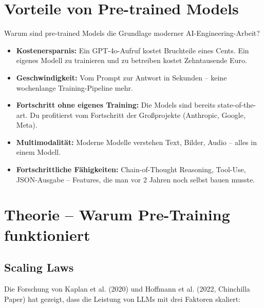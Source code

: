 \section{Vorteile von Pre-trained Models}

Warum sind pre-trained Models die Grundlage moderner AI-Engineering-Arbeit?

\begin{itemize}[leftmargin=*]
    \item \textbf{Kostenersparnis:} Ein GPT-4o-Aufruf kostet Bruchteile eines Cents. Ein eigenes Modell zu trainieren und zu betreiben kostet Zehntausende Euro.
    \item \textbf{Geschwindigkeit:} Vom Prompt zur Antwort in Sekunden -- keine wochenlange Training-Pipeline mehr.
    \item \textbf{Fortschritt ohne eigenes Training:} Die Models sind bereits state-of-the-art. Du profitierst vom Fortschritt der Großprojekte (Anthropic, Google, Meta).
    \item \textbf{Multimodalität:} Moderne Modelle verstehen Text, Bilder, Audio -- alles in einem Modell.
    \item \textbf{Fortschrittliche Fähigkeiten:} Chain-of-Thought Reasoning, Tool-Use, JSON-Ausgabe -- Features, die man vor 2 Jahren noch selbst bauen musste.
\end{itemize}


\section{Theorie -- Warum Pre-Training funktioniert}

\subsection{Scaling Laws}

Die Forschung von Kaplan et al. (2020) und Hoffmann et al. (2022, Chinchilla Paper) hat gezeigt, dass die Leistung von LLMs mit drei Faktoren skaliert:

